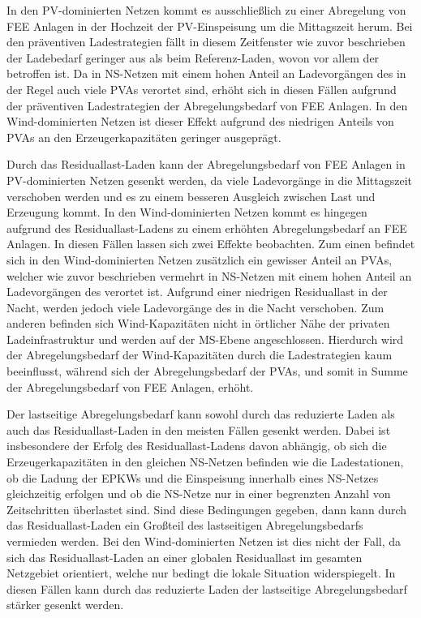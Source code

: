 In den \gls{PV}-dominierten Netzen kommt es ausschließlich zu einer Abregelung von \gls{FEE} Anlagen in der Hochzeit der \gls{PV}-Einspeisung um die Mittagszeit herum.
Bei den präventiven Ladestrategien fällt in diesem Zeitfenster wie zuvor beschrieben der Ladebedarf geringer aus als beim Referenz-Laden, wovon vor allem der \UC \zH betroffen ist.
Da in \gls{NS}-Netzen mit einem hohen Anteil an Ladevorgängen des \UC \zH in der Regel auch viele \glspl{PVA} verortet sind, erhöht sich in diesen Fällen aufgrund der präventiven Ladestrategien der Abregelungsbedarf von \gls{FEE} Anlagen.
In den Wind-dominierten Netzen ist dieser Effekt aufgrund des niedrigen Anteils von \glspl{PVA} an den Erzeugerkapazitäten geringer ausgeprägt.\medskip

Durch das Residuallast-Laden kann der Abregelungsbedarf von \gls{FEE} Anlagen in \gls{PV}-dominierten Netzen gesenkt werden, da viele Ladevorgänge in die Mittagszeit verschoben werden und es zu einem besseren Ausgleich zwischen Last und Erzeugung kommt.
In den Wind-dominierten Netzen kommt es hingegen aufgrund des Residuallast-Ladens zu einem erhöhten Abregelungsbedarf an \gls{FEE} Anlagen.
In diesen Fällen lassen sich zwei Effekte beobachten.
Zum einen befindet sich in den Wind-dominierten Netzen zusätzlich ein gewisser Anteil an \glspl{PVA}, welcher wie zuvor beschrieben vermehrt in \gls{NS}-Netzen mit einem hohen Anteil an Ladevorgängen des \UC \zH verortet ist.
Aufgrund einer niedrigen Residuallast in der Nacht, werden jedoch viele Ladevorgänge des \UC \zH in die Nacht verschoben.
Zum anderen befinden sich Wind-Kapazitäten nicht in örtlicher Nähe der privaten Ladeinfrastruktur und werden auf der \gls{MS}-Ebene angeschlossen.
Hierdurch wird der Abregelungsbedarf der Wind-Kapazitäten durch die Ladestrategien kaum beeinflusst, während sich der Abregelungsbedarf der \glspl{PVA}, und somit in Summe der Abregelungsbedarf von \gls{FEE} Anlagen, erhöht.\medskip

Der lastseitige Abregelungsbedarf kann sowohl durch das reduzierte Laden als auch das Residuallast-Laden in den meisten Fällen gesenkt werden.
Dabei ist insbesondere der Erfolg des Residuallast-Ladens davon abhängig, ob sich die Erzeugerkapazitäten in den gleichen \gls{NS}-Netzen befinden wie die Ladestationen, ob die Ladung der \glspl{EPKW} und die Einspeisung innerhalb eines \gls{NS}-Netzes gleichzeitig erfolgen und ob die \gls{NS}-Netze nur in einer begrenzten Anzahl von Zeitschritten überlastet sind.
Sind diese Bedingungen gegeben, dann kann durch das Residuallast-Laden ein Großteil des lastseitigen Abregelungsbedarfs vermieden werden.
Bei den Wind-dominierten Netzen ist dies nicht der Fall, da sich das Residuallast-Laden an einer globalen Residuallast im gesamten Netzgebiet orientiert, welche nur bedingt die lokale Situation widerspiegelt.
In diesen Fällen kann durch das reduzierte Laden der lastseitige Abregelungsbedarf stärker gesenkt werden.\medskip

